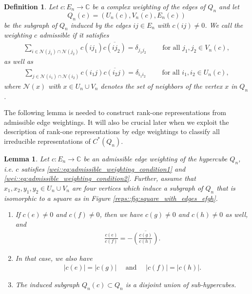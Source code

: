 \documentclass[a4paper]{amsart}
\newcommand{\C}{\mathbb{C}}
\newtheorem{definition}[thm]{Definition}
\newtheorem{lemma}[thm]{Lemma}
\begin{document}
\begin{definition}
    \label{reps::def:admissible_weightings}
    Let $c: E_n \to \C$ be a complex weighting of the edges of $Q_n$ and let 
    $$
    Q_n(c) = (U_n(c), V_n(c), E_n(c))
    $$
    be the subgraph of $Q_n$ induced by the edges $ij \in E_n$ with $c(ij) \neq 0$.
    We call the weighting $c$ \emph{admissible} if it satisfies
    \begin{align}
        \label{wei::eq:admissible_weighting_condition1}
        \sum_{i \in \mathcal{N}(j_1) \cap \mathcal{N}(j_2)} c(ij_1) \overline{c(ij_2)} = \delta_{j_1j_2} \qquad \text{ for all } j_1, j_2 \in V_n(c),
    \end{align}
    as well as
    \begin{align}
        \label{wei::eq:admissible_weighting_condition2}
        \sum_{j \in \mathcal{N}(i_1) \cap \mathcal{N}(i_2)} c(i_1j) \overline{c(i_2j)} = \delta_{i_1i_2} \qquad \text{ for all } i_1, i_2 \in U_n(c),
    \end{align}
    where $\mathcal{N}(x)$ with $x \in U_n \cup V_n$ denotes the set of neighbors of the vertex $x$ in $Q_n$.
\end{definition}

The following lemma is needed to construct rank-one representations from admissible edge weightings. It will also be crucial later when we exploit the description of rank-one representations by edge weightings to classify all irreducible representations of $C^\ast(Q_n)$.

\begin{lemma}
    \label{reps::lemma:admissible_weightings_and_squares}
    Let $c: E_n \to \C$ be an admissible edge weighting of the hypercube $Q_n$, i.e. $c$ satisfies \eqref{wei::eq:admissible_weighting_condition1} and \eqref{wei::eq:admissible_weighting_condition2}. Further, assume that $x_1, x_2, y_1, y_2 \in U_n \cup V_n$ are four vertices which induce a subgraph of $Q_n$ that is isomorphic to a square as in Figure \ref{reps::fig:square_with_edges_efgh}. 
    \begin{enumerate}
        \item If $c(e) \neq 0$ and $c(f) \neq 0$, then we have $c(g) \neq 0$ and $c(h) \neq 0$ as well, and
        \begin{align*}
            \frac{c(e)}{c(f)} = - \overline{\left( \frac{c(g)}{c(h)} \right)}.
        \end{align*}
        \item In that case, we also have 
        \begin{align*}
            |c(e)| = |c(g)| \quad \text{ and } \quad |c(f)| = |c(h)|.
        \end{align*}
        \item The induced subgraph $Q_n(c) \subset Q_n$ is a disjoint union of sub-hypercubes.
    \end{enumerate}
\end{lemma}
\end{document}
